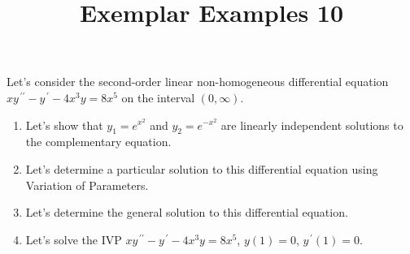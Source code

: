 \documentclass{ximera}
\begin{document}
\begin{abstract}
 \end{abstract}

    \title{Exemplar Examples 10}
    
    \maketitle


Let's consider the second-order linear non-homogeneous differential equation \\$xy^{\,\prime\prime}-y^{\,\prime}-4x^3y=8x^5$ on the interval $(0,\infty)$.

\begin{enumerate}

\item Let's show that $y_1=e^{x^2}$ and $y_2=e^{-x^2}$ are linearly independent solutions to the complementary equation.

\vfill

\item Let's determine a particular solution to this differential equation using Variation of Parameters.



\vfill
\vfill
\vfill

\newpage

\item Let's determine the general solution to this differential equation.



\vfill

\item Let's solve the IVP $xy^{\,\prime\prime}-y^{\,\prime}-4x^3y=8x^5$, $y(1)=0$, $y^{\,\prime}(1)=0$.



\vfill
\vfill
\vfill


\end{enumerate}
\end{document}
